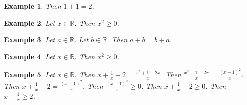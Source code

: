 \documentclass[12pt]{article}
\newtheorem{example}{Example}
\begin{document}

\begin{example}
    Then $1+1=2$.
\end{example}

\begin{example}
    Let $x\in\mathbb{R}$. Then $x^2\ge 0$.
\end{example}

\begin{example}
    Let $a\in\mathbb{R}$. Let $b\in\mathbb{R}$. Then $a+b=b+a$.
\end{example}

\begin{example}
    Let $x\in\mathbb{R}$. Then $x^2 \ge 0$.
\end{example}

\begin{example}
    Let $x\in\mathbb{R}$. Then $x + \frac{1}{x} - 2 = \frac{x^2 + 1 - 2x}{x}$. 
    Then $\frac{x^2 + 1 - 2x}{x} = \frac{{(x-1)}^2}{x}$.
    Then $x + \frac{1}{x} - 2 = \frac{{(x-1)}^2}{x}$. 
    Then $\frac{{(x-1)}^2}{x} \ge 0$. 
    Then $x + \frac{1}{x} - 2 \ge 0$. 
    Then $x + \frac{1}{x} \ge 2$.
\end{example}





\end{document}
